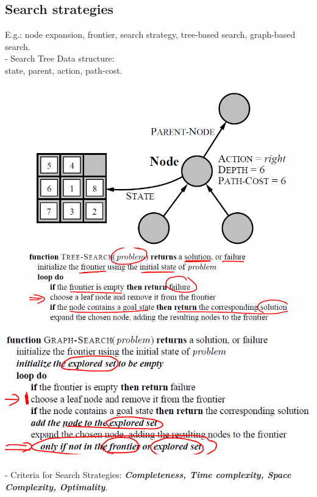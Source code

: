 \documentclass{article}
\begin{document}
\subsection{Search strategies}
E.g.: node expansion, frontier, search strategy, tree-based search, graph-based search.\\
- Search Tree Data structure:\\
state, parent, action, path-cost.\\

\begin{figure}[h!]
\includegraphics[scale=0.6]{10.png}
\includegraphics[scale=0.6]{11.png}
\end{figure}

\includegraphics[scale=0.6]{12.png}\\\\
- Criteria for Search Strategies: \textbf{\textit{Completeness, Time complexity, Space Complexity, Optimality}}.\\
\end{document}

